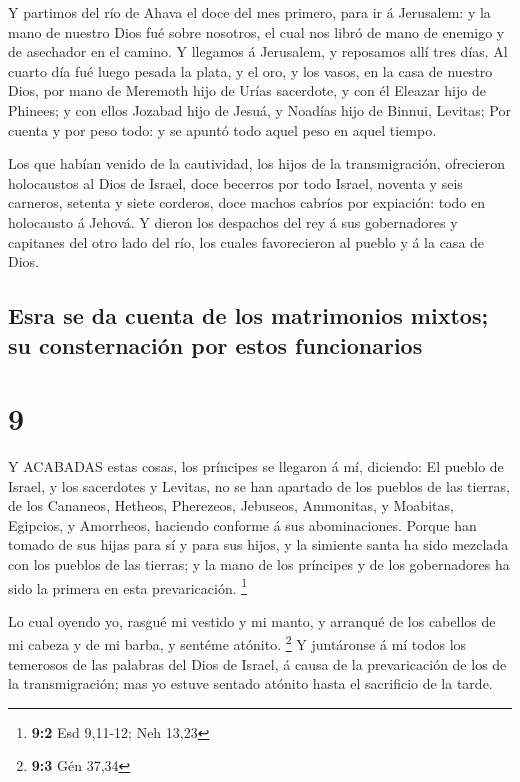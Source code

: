  Y partimos del río de Ahava el doce del mes primero, para
ir á Jerusalem: y la mano de nuestro Dios fué sobre nosotros, el cual
nos libró de mano de enemigo y de asechador en el camino. 
Y llegamos á Jerusalem, y reposamos allí tres días.  Al
cuarto día fué luego pesada la plata, y el oro, y los vasos, en la casa
de nuestro Dios, por mano de Meremoth hijo de Urías sacerdote, y con él
Eleazar hijo de Phinees; y con ellos Jozabad hijo de Jesuá, y Noadías
hijo de Binnui, Levitas;  Por cuenta y por peso todo: y se
apuntó todo aquel peso en aquel tiempo.

 Los que habían venido de la cautividad, los hijos de la
transmigración, ofrecieron holocaustos al Dios de Israel, doce becerros
por todo Israel, noventa y seis carneros, setenta y siete corderos, doce
machos cabríos por expiación: todo en holocausto á Jehová. 
Y dieron los despachos del rey á sus gobernadores y capitanes del otro
lado del río, los cuales favorecieron al pueblo y á la casa de Dios.

\hypertarget{esra-se-da-cuenta-de-los-matrimonios-mixtos-su-consternaciuxf3n-por-estos-funcionarios}{%
\subsection{Esra se da cuenta de los matrimonios mixtos; su
consternación por estos
funcionarios}\label{esra-se-da-cuenta-de-los-matrimonios-mixtos-su-consternaciuxf3n-por-estos-funcionarios}}

\hypertarget{section-8}{%
\section{9}\label{section-8}}

 Y ACABADAS estas cosas, los príncipes se llegaron á mí,
diciendo: El pueblo de Israel, y los sacerdotes y Levitas, no se han
apartado de los pueblos de las tierras, de los Cananeos, Hetheos,
Pherezeos, Jebuseos, Ammonitas, y Moabitas, Egipcios, y Amorrheos,
haciendo conforme á sus abominaciones.  Porque han tomado de
sus hijas para sí y para sus hijos, y la simiente santa ha sido mezclada
con los pueblos de las tierras; y la mano de los príncipes y de los
gobernadores ha sido la primera en esta prevaricación. \footnote{\textbf{9:2}
  Esd 9,11-12; Neh 13,23}

 Lo cual oyendo yo, rasgué mi vestido y mi manto, y arranqué
de los cabellos de mi cabeza y de mi barba, y sentéme atónito.
\footnote{\textbf{9:3} Gén 37,34}  Y juntáronse á mí todos
los temerosos de las palabras del Dios de Israel, á causa de la
prevaricación de los de la transmigración; mas yo estuve sentado atónito
hasta el sacrificio de la tarde.

